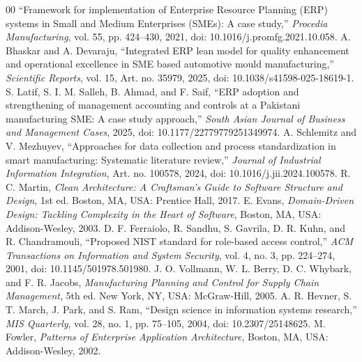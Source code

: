 \documentclass[conference]{IEEEtran}
\begin{document}
\begin{thebibliography}{00}
 ``Framework for implementation of Enterprise Resource Planning (ERP) systems in Small and Medium Enterprises (SMEs): A case study,'' \textit{Procedia Manufacturing}, vol. 55, pp. 424--430, 2021, doi: 10.1016/j.promfg.2021.10.058.
 A. Bhaskar and A. Devaraju, ``Integrated ERP lean model for quality enhancement and operational excellence in SME based automotive mould manufacturing,'' \textit{Scientific Reports}, vol. 15, Art. no. 35979, 2025, doi: 10.1038/s41598-025-18619-1.
 S. Latif, S. I. M. Salleh, B. Ahmad, and F. Saif, ``ERP adoption and strengthening of management accounting and controls at a Pakistani manufacturing SME: A case study approach,'' \textit{South Asian Journal of Business and Management Cases}, 2025, doi: 10.1177/22779779251349974.
 A. Schlemitz and V. Mezhuyev, ``Approaches for data collection and process standardization in smart manufacturing: Systematic literature review,'' \textit{Journal of Industrial Information Integration}, Art. no. 100578, 2024, doi: 10.1016/j.jii.2024.100578.
 R. C. Martin, \textit{Clean Architecture: A Craftsman's Guide to Software Structure and Design}, 1st ed. Boston, MA, USA: Prentice Hall, 2017.
 E. Evans, \textit{Domain-Driven Design: Tackling Complexity in the Heart of Software}, Boston, MA, USA: Addison-Wesley, 2003.
 D. F. Ferraiolo, R. Sandhu, S. Gavrila, D. R. Kuhn, and R. Chandramouli, ``Proposed NIST standard for role-based access control,'' \textit{ACM Transactions on Information and System Security}, vol. 4, no. 3, pp. 224--274, 2001, doi: 10.1145/501978.501980.
 J. O. Vollmann, W. L. Berry, D. C. Whybark, and F. R. Jacobs, \textit{Manufacturing Planning and Control for Supply Chain Management}, 5th ed. New York, NY, USA: McGraw-Hill, 2005.
 A. R. Hevner, S. T. March, J. Park, and S. Ram, ``Design science in information systems research,'' \textit{MIS Quarterly}, vol. 28, no. 1, pp. 75--105, 2004, doi: 10.2307/25148625.
 M. Fowler, \textit{Patterns of Enterprise Application Architecture}, Boston, MA, USA: Addison-Wesley, 2002.
\end{thebibliography}
\end{document}
